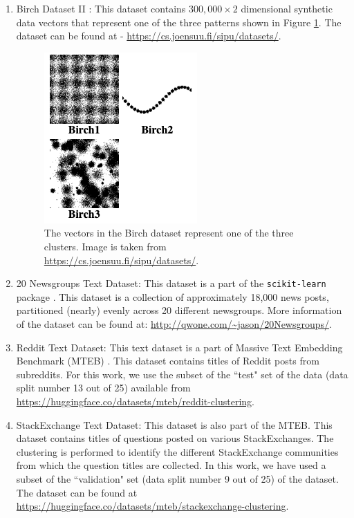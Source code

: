 \documentclass{article}
\begin{document}
\begin{enumerate}
    \item Birch Dataset II \cite{Birchsets}: This dataset contains $300,000 \times 2$ dimensional synthetic data vectors that represent one of the three patterns shown in Figure \ref{fig:birch}. The dataset can be found at - \url{https://cs.joensuu.fi/sipu/datasets/}. 
    \begin{figure}[H]
    \centering
    \includegraphics[width=0.25\linewidth]{images/birch_patterns.png}
    \caption{The vectors in the Birch dataset represent one of the three clusters. Image is taken from \url{https://cs.joensuu.fi/sipu/datasets/}.}
    \label{fig:birch}
    \end{figure}

    \item 20 Newsgroups Text Dataset: This dataset is a part of the \texttt{scikit-learn} package \cite{scikit-learn}. This dataset is a collection of approximately 18,000 news posts, partitioned (nearly) evenly across 20 different newsgroups. More information of the dataset can be found at: \url{http://qwone.com/~jason/20Newsgroups/}. 

    \item Reddit Text Dataset: This text dataset is a part of Massive Text Embedding Benchmark (MTEB) \cite{muennighoff-etal-2023-mteb}. This dataset contains titles of Reddit posts from subreddits. For this work, we use the subset of the ``test" set of the data (data split number 13 out of 25) available from \url{https://huggingface.co/datasets/mteb/reddit-clustering}. 

    \item StackExchange Text Dataset: This dataset is also part of the MTEB. This dataset contains titles of questions posted on various StackExchanges. The clustering is performed to identify the different StackExchange communities from which the question titles are collected. In this work, we have used a subset of the ``validation" set (data split number 9 out of 25) of the dataset. The dataset can be found at \url{https://huggingface.co/datasets/mteb/stackexchange-clustering}. 
    

\end{enumerate}
\end{document}
